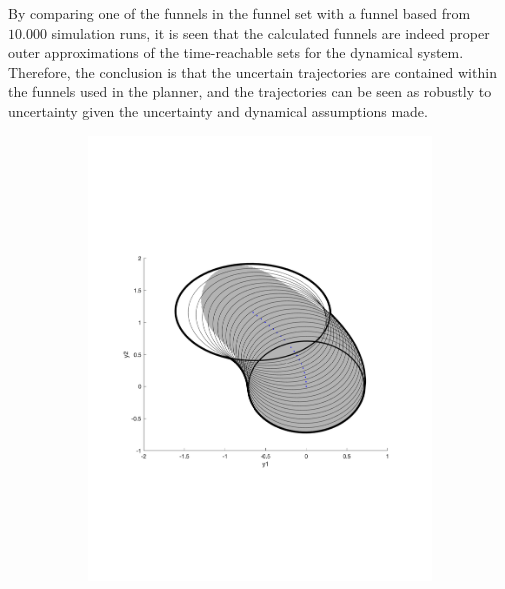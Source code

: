 By comparing one of the funnels in the funnel set with a funnel based from
\(10.000\) simulation runs, it is seen that the calculated funnels are indeed
proper outer approximations of the time-reachable sets for the dynamical system.
Therefore, the conclusion is that the uncertain trajectories are contained
within the funnels used in the planner, and the trajectories can be seen as
robustly to uncertainty given the uncertainty and dynamical assumptions made.

\begin{figure}
  \begin{subfigure}[b]{0.3\textwidth}
    \includegraphics[width=\textwidth]{figures/experiments/FunnelSim4}
  \end{subfigure}
  \begin{subfigure}[b]{0.3\textwidth}

\end{subfigure}
\end{figure}
